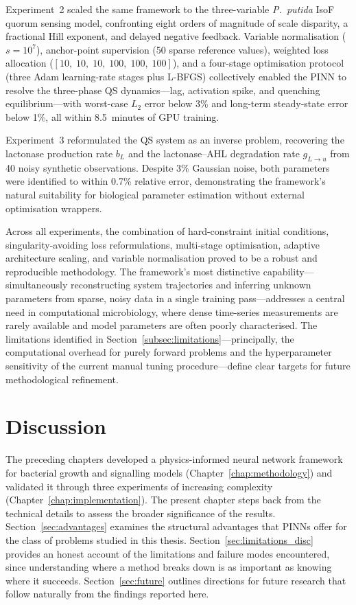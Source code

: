 \documentclass[14pt,a4paper,openany]{extbook}
\begin{document}
Experiment~2 scaled the same framework to the three-variable \textit{P.~putida} IsoF quorum sensing model, confronting eight orders of magnitude of scale disparity, a fractional Hill exponent, and delayed negative feedback. Variable normalisation ($s = 10^7$), anchor-point supervision (50 sparse reference values), weighted loss allocation ($[10,\; 10,\; 10,\; 100,\; 100,\; 100]$), and a four-stage optimisation protocol (three Adam learning-rate stages plus L-BFGS) collectively enabled the PINN to resolve the three-phase QS dynamics---lag, activation spike, and quenching equilibrium---with worst-case $L_2$ error below 3\% and long-term steady-state error below 1\%, all within 8.5~minutes of GPU training.

Experiment~3 reformulated the QS system as an inverse problem, recovering the lactonase production rate $b_L$ and the lactonase--AHL degradation rate $g_{L \to u}$ from 40 noisy synthetic observations. Despite 3\% Gaussian noise, both parameters were identified to within 0.7\% relative error, demonstrating the framework's natural suitability for biological parameter estimation without external optimisation wrappers.

Across all experiments, the combination of hard-constraint initial conditions, singularity-avoiding loss reformulations, multi-stage optimisation, adaptive architecture scaling, and variable normalisation proved to be a robust and reproducible methodology. The framework's most distinctive capability---simultaneously reconstructing system trajectories and inferring unknown parameters from sparse, noisy data in a single training pass---addresses a central need in computational microbiology, where dense time-series measurements are rarely available and model parameters are often poorly characterised. The limitations identified in Section~\ref{subsec:limitations}---principally, the computational overhead for purely forward problems and the hyperparameter sensitivity of the current manual tuning procedure---define clear targets for future methodological refinement.

\chapter{Discussion}
\label{chap:discussion}

The preceding chapters developed a physics-informed neural network framework for bacterial growth and signalling models (Chapter~\ref{chap:methodology}) and validated it through three experiments of increasing complexity (Chapter~\ref{chap:implementation}). The present chapter steps back from the technical details to assess the broader significance of the results. Section~\ref{sec:advantages} examines the structural advantages that PINNs offer for the class of problems studied in this thesis. Section~\ref{sec:limitations_disc} provides an honest account of the limitations and failure modes encountered, since understanding where a method breaks down is as important as knowing where it succeeds. Section~\ref{sec:future} outlines directions for future research that follow naturally from the findings reported here.
\end{document}
